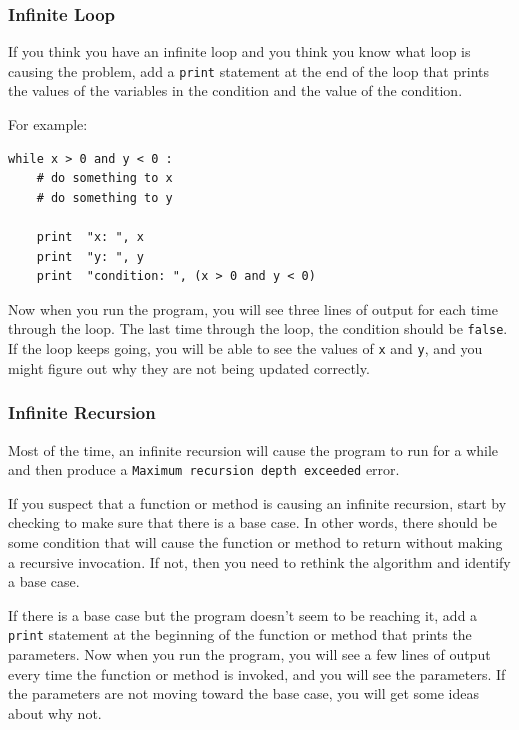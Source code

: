 \documentclass[10pt]{book}
\begin{document}
\subsubsection{Infinite Loop}

If you think you have an infinite loop and you think you know
what loop is causing the problem, add a {\tt print} statement at
the end of the loop that prints the values of the variables in
the condition and the value of the condition.

For example:

\beforeverb
\begin{verbatim}
while x > 0 and y < 0 :
    # do something to x
    # do something to y

    print  "x: ", x
    print  "y: ", y
    print  "condition: ", (x > 0 and y < 0)
\end{verbatim}
\afterverb
%
Now when you run the program, you will see three lines of output
for each time through the loop.  The last time through the
loop, the condition should be {\tt false}.  If the loop keeps
going, you will be able to see the values of {\tt x} and {\tt y},
and you might figure out why they are not being updated correctly.


\subsubsection{Infinite Recursion}

Most of the time, an infinite recursion will cause the program to run
for a while and then produce a {\tt Maximum recursion depth exceeded}
error.

If you suspect that a function or method is causing an infinite
recursion, start by checking to make sure that there is a base case.
In other words, there should be some condition that will cause the
function or method to return without making a recursive invocation.
If not, then you need to rethink the algorithm and identify a base
case.

If there is a base case but the program doesn't seem to be reaching
it, add a {\tt print} statement at the beginning of the function or method
that prints the parameters.  Now when you run the program, you will see
a few lines of output every time the function or method is invoked,
and you will see the parameters.  If the parameters are not moving
toward the base case, you will get some ideas about why not.
\end{document}
